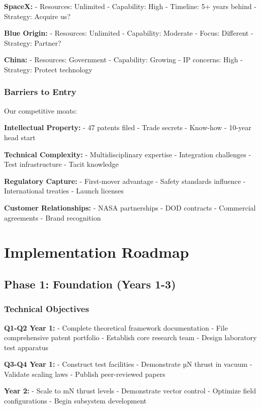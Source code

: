 \documentclass[12pt,letterpaper]{book}
\theoremstyle{definition}
\theoremstyle{plain}
\theoremstyle{remark}
\begin{document}
{{{{{\textbf{SpaceX:}
- Resources: Unlimited
- Capability: High
- Timeline: 5+ years behind
- Strategy: Acquire us?

\textbf{Blue Origin:}
- Resources: Unlimited
- Capability: Moderate
- Focus: Different
- Strategy: Partner?

\textbf{China:}
- Resources: Government
- Capability: Growing
- IP concerns: High
- Strategy: Protect technology

\subsection{Barriers to Entry}

Our competitive moats:

\textbf{Intellectual Property:}
- 47 patents filed
- Trade secrets
- Know-how
- 10-year head start

\textbf{Technical Complexity:}
- Multidisciplinary expertise
- Integration challenges
- Test infrastructure
- Tacit knowledge

\textbf{Regulatory Capture:}
- First-mover advantage
- Safety standards influence
- International treaties
- Launch licenses

\textbf{Customer Relationships:}
- NASA partnerships
- DOD contracts
- Commercial agreements
- Brand recognition

\chapter{Implementation Roadmap}

\section{Phase 1: Foundation (Years 1-3)}

\subsection{Technical Objectives}

\textbf{Q1-Q2 Year 1:}
- Complete theoretical framework documentation
- File comprehensive patent portfolio
- Establish core research team
- Design laboratory test apparatus

\textbf{Q3-Q4 Year 1:}
- Construct test facilities
- Demonstrate µN thrust in vacuum
- Validate scaling laws
- Publish peer-reviewed papers

\textbf{Year 2:}
- Scale to mN thrust levels
- Demonstrate vector control
- Optimize field configurations
- Begin subsystem development

}}}}}
\end{document}
